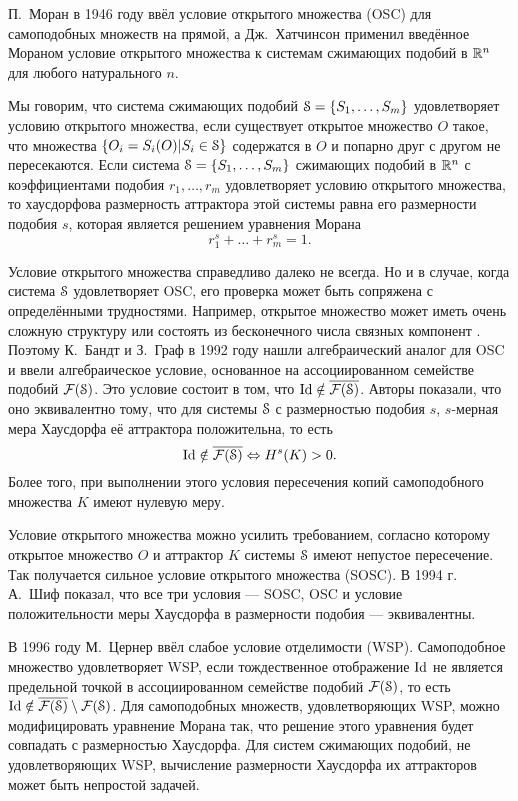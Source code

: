 П.~Моран в 1946 году \cite{Moran1946} ввёл условие открытого множества (OSC) для самоподобных множеств на прямой, а Дж.~Хатчинсон \cite{Hut1981} применил введённое Мораном условие открытого множества к системам сжимающих подобий в $\mathbb{R}^n$ для любого натурального $n$.

Мы говорим, что система сжимающих подобий \linebreak ${\EuScript S}=\{S_1, \ldots, S_m\}$ удовлетворяет условию открытого множества, если существует открытое множество $O$ такое, что множества $\{O_i=S_i(O) | S_i\in{\EuScript S}\}$ содержатся в $O$ и попарно друг с другом не пересекаются.
Если система ${\EuScript S}=\{S_1,\ldots,S_m\}$ сжимающих подобий в $\mathbb{R}^n$ с коэффициентами подобия $r_1, \ldots, r_m$ удовлетворяет условию открытого множества, то хаусдорфова размерность аттрактора этой системы равна его размерности подобия $s$, которая является решением уравнения Морана
$$r_1^s+\ldots+r_m^s=1.$$

Условие открытого множества справедливо далеко не всегда. Но и в случае, когда система ${\EuScript S}$ удовлетворяет OSC, его проверка может быть сопряжена с определёнными трудностями.
Например, открытое множество может иметь очень сложную структуру или состоять из бесконечного числа связных компонент \cite{AST2024}.
Поэтому К.~Бандт и З.~Граф в 1992 году \cite{SSS7} нашли алгебраический аналог для OSC и ввели алгебраическое условие, основанное на ассоциированном семействе подобий $\mathcal{F}({\EuScript S})$.
Это условие состоит в том, что $\mathop{\rm Id} \nolimits\notin\overline{\mathcal{F}({\EuScript S})}$. Авторы показали, что оно эквивалентно тому, что для системы ${\EuScript S}$ с размерностью подобия $s$, $s$-мерная мера Хаусдорфа её аттрактора положительна, то есть
$$\mathop{\rm Id} \nolimits\notin\overline{\mathcal{F}({\EuScript S})} \Leftrightarrow H^s(K)>0.$$
Более того, при выполнении этого условия пересечения копий самоподобного множества $K$ имеют нулевую меру.

Условие открытого множества можно усилить требованием, согласно которому открытое множество $O$ и аттрактор $K$ системы ${\EuScript S}$ имеют непустое пересечение.
Так получается сильное условие открытого множества (SOSC).
В 1994 г. А.~Шиф \cite{Schief1994} показал, что все три условия --- SOSC, OSC и условие положительности меры Хаусдорфа в размерности подобия --- эквивалентны.

В 1996 году М.~Цернер \cite{Zerner1996} ввёл слабое условие отделимости (WSP).
Самоподобное множество удовлетворяет WSP, если тождественное отображение $\mathop{\rm Id} \nolimits$ не является предельной точкой в ассоциированном семействе подобий $\mathcal{F}({\EuScript S})$, то есть $\mathop{\rm Id} \nolimits\notin\overline{\mathcal{F}({\EuScript S})}\setminus\mathcal{F}({\EuScript S})$.
Для самоподобных множеств, удовлетворяющих WSP, можно модифицировать уравнение Морана так, что решение этого уравнения будет совпадать с размерностью Хаусдорфа.
Для систем сжимающих подобий, не удовлетворяющих WSP, вычисление размерности Хаусдорфа их аттракторов может быть непростой задачей.


